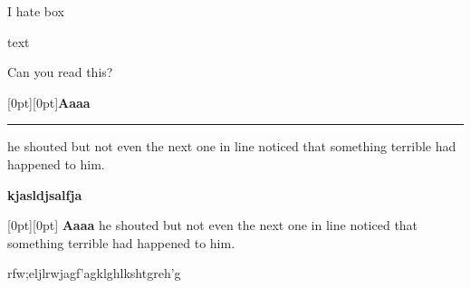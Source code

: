 \documentclass[a4paper,12pt]{letter}
\begin{document}
\parbox[r]{5cm}{I hate box}
\begin{minipage}[c]{6cm} text 
\end{minipage}



\par
{}\par
{} \par
{} \par
{}
Can you read this?




\raisebox{0pt}[0pt][0pt]{\Large \textbf{Aaaa\raisebox{-0.3ex}{a}
\raisebox{-0.7ex}{aa}%
\raisebox{-1.2ex}{r}%
\raisebox{-2.2ex}{g}%
\raisebox{-4.5ex}{h}}}

\rule{10cm}{1pt}

he shouted but not even the next
one in line noticed that something
terrible had happened to him.

\vspace{10cm}

\textbf{kjasldjsalfja} \linebreak
\raisebox{1ex}{\rule{10cm}{1pt}}

\raisebox{0pt}[0pt][0pt]{\Large%
\textbf{Aaaa\raisebox{-0.3ex}{a}%
\raisebox{-4.5ex}{h}}}
he shouted but not even the next
one in line noticed that something
terrible had happened to him.



rfw;eljlrwjagf'agklghlkshtgreh'g
\end{document}
